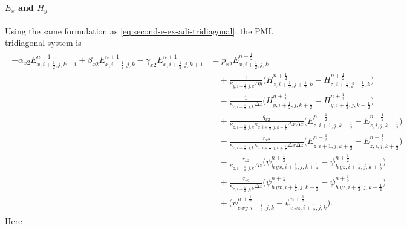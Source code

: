 \documentclass{article}
\numberwithin{equation}{section}
\numberwithin{figure}{section}
\begin{document}
\paragraph{$E_x$ and $H_y$}
Using the same formulation as \eqref{eq:second-e-ex-adi-tridiagonal}, the PML tridiagonal system is
\begin{align}
    \begin{split}
        -\alpha_{x2}E_{x,i+\tfrac12,j,k-1}^{n+1} + \beta_{x2}E_{x,i+\tfrac12,j,k}^{n+1} - \gamma_{x2}E_{x,i+\tfrac12,j,k+1}^{n+1}
         & = p_{x2}E_{x,i+\tfrac12,j,k}^{n+\frac12}                                                                                                                                       \\
         & \quad +\frac{1}{\kappa_{y,i+\tfrac12,j,k}\Delta y}\Big(H_{z,i+\tfrac12,j+\tfrac12,k}^{n+\frac12}-H_{z,i+\tfrac12,j-\tfrac12,k}^{n+\frac12}\Big)                                \\
         & \quad -\frac{1}{\kappa_{z,i+\tfrac12,j,k}\Delta z}\Big(H_{y,i+\tfrac12,j,k+\tfrac12}^{n+\frac12}-H_{y,i+\tfrac12,j,k-\tfrac12}^{n+\frac12}\Big)                                \\
         & \quad +\frac{q_{x2}}{\kappa_{z,i+\tfrac12,j,k}\kappa_{x,i+\tfrac12,j,k-\tfrac12}\Delta x\Delta z}\Big(E_{z,i+1,j,k-\tfrac12}^{n+\frac12}-E_{z,i,j,k-\tfrac12}^{n+\frac12}\Big) \\
         & \quad -\frac{r_{x2}}{\kappa_{z,i+\tfrac12,j,k}\kappa_{x,i+\tfrac12,j,k+\tfrac12}\Delta x\Delta z}\Big(E_{z,i+1,j,k+\tfrac12}^{n+\frac12}-E_{z,i,j,k+\tfrac12}^{n+\frac12}\Big) \\
         & \quad -\frac{r_{x2}}{\kappa_{z,i+\tfrac12,j,k}\Delta z}\Big(\psi^{n+\frac12}_{h\,yx,i+\tfrac12,j,k+\tfrac12} - \psi^{n+\frac12}_{h\,yz,i+\tfrac12,j,k+\tfrac12}\Big)           \\
         & \quad +\frac{q_{x2}}{\kappa_{z,i+\tfrac12,j,k}\Delta z}\Big(\psi^{n+\frac12}_{h\,yx,i+\tfrac12,j,k-\tfrac12} - \psi^{n+\frac12}_{h\,yz,i+\tfrac12,j,k-\tfrac12}\Big)           \\
         & \quad +\Big(\psi^{n+\frac12}_{e\,xy,i+\tfrac12,j,k}-\psi^{n+\frac12}_{e\,xz,i+\tfrac12,j,k}\Big).
    \end{split}
    \label{eq:second-e-ex-pml-adi-tridiagonal}
\end{align}
Here
\end{document}

